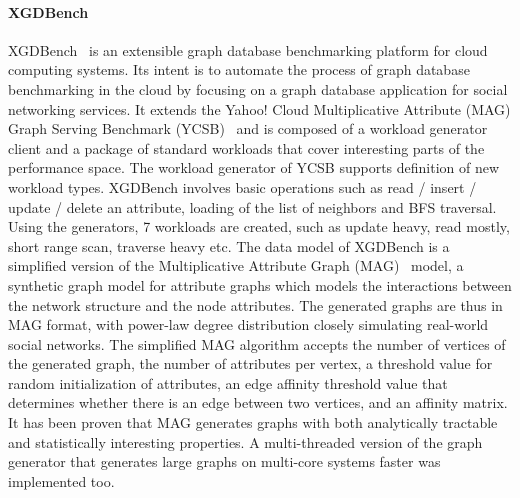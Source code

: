 \paragraph{XGDBench} XGDBench~\cite{Dayarathna:2014:GDB:2676904.2676939} is an extensible graph database benchmarking platform for cloud computing systems. Its intent is to automate
the process of graph database benchmarking in the cloud by focusing on a graph database application for social networking services. It extends the Yahoo! Cloud Multiplicative Attribute (MAG) Graph Serving Benchmark (YCSB)~\cite{Cooper:2010:BCS:1807128.1807152} and is composed of a workload generator client and a package of standard workloads that cover interesting parts of the performance space.
The workload generator of YCSB supports definition of new workload types. XGDBench involves basic operations such as read / insert / update / delete an attribute, loading of the list of neighbors and BFS traversal. Using the generators, 7 workloads are created, such as update heavy, read mostly, short range scan, traverse heavy etc.
The data model of XGDBench is a simplified version of the Multiplicative Attribute Graph (MAG)~\cite{Kim2010} model, a synthetic graph model for attribute graphs which models the interactions between the network structure and the node attributes.
The generated graphs are thus in MAG format, with power-law degree distribution closely simulating real-world social networks.
The simplified MAG algorithm accepts the number of vertices of the generated graph, the number of attributes per vertex, a threshold value for random initialization of attributes, an edge affinity threshold value that determines whether there is an edge between two vertices, and an affinity matrix. It has been proven that MAG generates graphs with both analytically tractable and statistically interesting properties. A multi-threaded version of the graph generator that generates large graphs on multi-core systems faster was implemented too.


